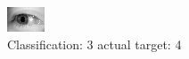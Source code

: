 \begin{figure}[h!]
\begin{center}
\includegraphics[width=0.60\columnwidth]{figures/ID3248_class_3_target_4.png}
\end{center}
\caption{ Classification: 3 actual target: 4}
\label{fig:ID3248_class_3_target_4}
\end{figure}
